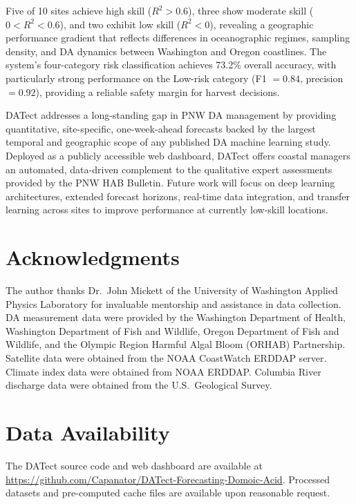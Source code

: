 \documentclass[preprint,12pt,authoryear]{elsarticle}
\begin{document}
Five of 10 sites achieve high skill ($R^2 > 0.6$), three show moderate skill ($0 < R^2 < 0.6$), and two exhibit low skill ($R^2 < 0$), revealing a geographic performance gradient that reflects differences in oceanographic regimes, sampling density, and DA dynamics between Washington and Oregon coastlines. The system's four-category risk classification achieves 73.2\% overall accuracy, with particularly strong performance on the Low-risk category (F1 $= 0.84$, precision $= 0.92$), providing a reliable safety margin for harvest decisions.

DATect addresses a long-standing gap in PNW DA management by providing quantitative, site-specific, one-week-ahead forecasts backed by the largest temporal and geographic scope of any published DA machine learning study. Deployed as a publicly accessible web dashboard, DATect offers coastal managers an automated, data-driven complement to the qualitative expert assessments provided by the PNW HAB Bulletin. Future work will focus on deep learning architectures, extended forecast horizons, real-time data integration, and transfer learning across sites to improve performance at currently low-skill locations.


\section*{Acknowledgments}

The author thanks Dr.\ John Mickett of the University of Washington Applied Physics Laboratory for invaluable mentorship and assistance in data collection. DA measurement data were provided by the Washington Department of Health, Washington Department of Fish and Wildlife, Oregon Department of Fish and Wildlife, and the Olympic Region Harmful Algal Bloom (ORHAB) Partnership. Satellite data were obtained from the NOAA CoastWatch ERDDAP server. Climate index data were obtained from NOAA ERDDAP. Columbia River discharge data were obtained from the U.S.\ Geological Survey.

\section*{Data Availability}

The DATect source code and web dashboard are available at \url{https://github.com/Capanator/DATect-Forecasting-Domoic-Acid}. Processed datasets and pre-computed cache files are available upon reasonable request.
\end{document}
